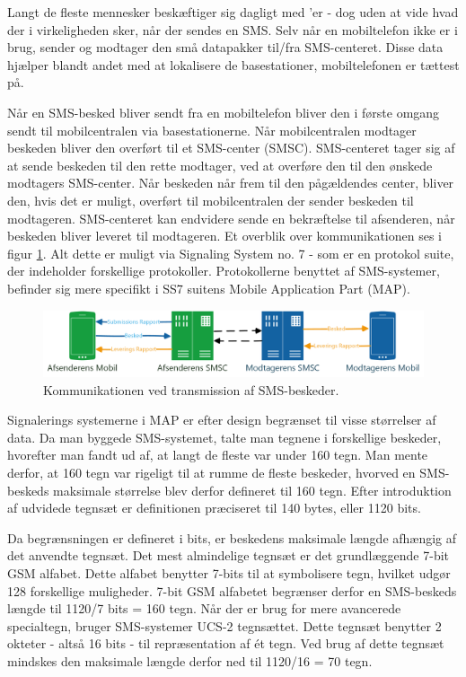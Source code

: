 Langt de fleste mennesker beskæftiger sig dagligt med 'er - dog uden at vide hvad der i virkeligheden sker, når der sendes en SMS. Selv når en mobiltelefon ikke er i brug, sender og modtager den små datapakker til/fra SMS-centeret. Disse data hjælper blandt andet med at lokalisere de basestationer, mobiltelefonen er tættest på.

Når en SMS-besked bliver sendt fra en mobiltelefon bliver den i første omgang sendt til mobilcentralen via basestationerne. Når mobilcentralen modtager beskeden bliver den overført til et SMS-center (SMSC). SMS-centeret tager sig af at sende beskeden til den rette modtager, ved at overføre den til den ønskede modtagers SMS-center. Når beskeden når frem til den pågældendes center, bliver den, hvis det er muligt, overført til mobilcentralen der sender beskeden til modtageren. SMS-centeret kan endvidere sende en bekræftelse til afsenderen, når beskeden bliver leveret til modtageren. Et overblik over kommunikationen ses i figur \ref{smsTransm}. Alt dette er muligt via Signaling System no. 7 - som er en protokol suite, der indeholder forskellige protokoller. Protokollerne benyttet af SMS-systemer, befinder sig mere specifikt i SS7 suitens Mobile Application Part (MAP). \cite{Pro_1} \cite{sms_max1}

\noindent
\begin{figure}[hba]
\includegraphics[width=\linewidth]{Billeder/Mobil.png}
\caption {Kommunikationen ved transmission af SMS-beskeder.}
\label{smsTransm}
\end{figure}

Signalerings systemerne i MAP er efter design begrænset til visse størrelser af data. Da man byggede SMS-systemet, talte man tegnene i forskellige beskeder, hvorefter man fandt ud af, at langt de fleste var under 160 tegn. Man mente derfor, at 160 tegn var rigeligt til at rumme de fleste beskeder, hvorved en SMS-beskeds maksimale størrelse blev derfor defineret til 160 tegn. Efter introduktion af udvidede tegnsæt er definitionen præciseret til 140 bytes, eller 1120 bits. \cite{sms_max1} \cite{_max2}


Da begrænsningen er defineret i bits, er beskedens maksimale længde afhængig af det anvendte tegnsæt. Det mest almindelige tegnsæt er det grundlæggende 7-bit GSM alfabet. Dette alfabet benytter 7-bits til at symbolisere tegn, hvilket udgør 128 forskellige muligheder. 7-bit GSM alfabetet begrænser derfor en SMS-beskeds længde til 1120/7 bits = 160 tegn. Når der er brug for mere avancerede specialtegn, bruger SMS-systemer UCS-2 tegnsættet. Dette tegnsæt benytter 2 okteter - altså 16 bits - til repræsentation af ét tegn. Ved brug af dette tegnsæt mindskes den maksimale længde derfor ned til 1120/16 = 70 tegn. \cite{sms_pdu}

